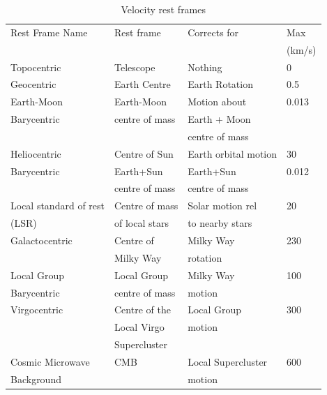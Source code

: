 \documentclass[force,almostfull,justified]{tufte-book}
\begin{document}
\begin{table}
\caption{Velocity rest frames}
\label{tab:rest_frames}
\small
\begin{minipage}{1.2\textwidth}
\begin{tabular}{|l|l|l|l|}
\hline \rule[-2ex]{0pt}{5.5ex} Rest Frame Name & Rest frame & Corrects for & Max  \\
 &  &  & (km/s) \\ 
\hline \rule[-2ex]{0pt}{5.5ex} Topocentric & Telescope & Nothing &0 \\ 
\hline \rule[-2ex]{0pt}{5.5ex} Geocentric & Earth Centre & Earth Rotation & 0.5 \\
\hline \rule[-2ex]{0pt}{5.5ex} Earth-Moon & Earth-Moon    & Motion about &  0.013\\
Barycentric & centre of mass & Earth + Moon &\\
                   & & centre of mass & \\
\hline \rule[-2ex]{0pt}{5.5ex} Heliocentric & Centre of Sun & Earth orbital motion & 30 \\
\hline \rule[-2ex]{0pt}{5.5ex} Barycentric & Earth+Sun & Earth+Sun & 0.012 \\
 & centre of mass  & centre of mass & \\
\hline \rule[-2ex]{0pt}{5.5ex} Local standard of rest& Centre of mass& Solar motion rel & 20 \\
(LSR) & of local stars&to nearby stars &\\
\hline \rule[-2ex]{0pt}{5.5ex} Galactocentric & Centre of  & Milky Way & 230  \\
 &Milky Way & rotation &\\
\hline \rule[-2ex]{0pt}{5.5ex}Local Group  & Local Group  &  Milky Way& 100  \\
Barycentric &  centre of mass & motion & \\
\hline \rule[-2ex]{0pt}{5.5ex}  Virgocentric& Centre of the &Local Group  & 300 \\
 & Local Virgo & motion & \\
 & Supercluster & & \\
\hline \rule[-2ex]{0pt}{5.5ex} Cosmic Microwave & CMB & Local Supercluster & 600 \\
Background &   & motion & \\
\hline 
\end{tabular} 
\end{minipage}
\end{table}

\bigskip
\end{document}
